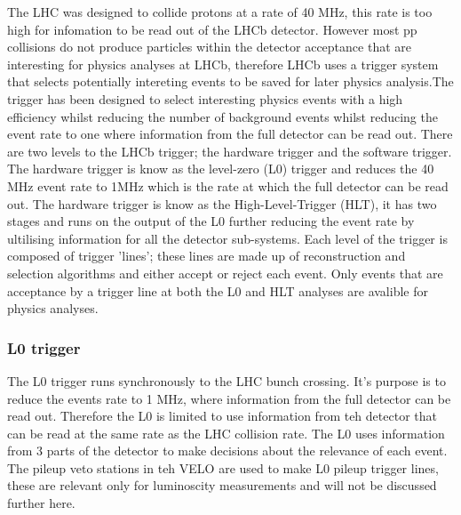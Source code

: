 The LHC was designed to collide protons at a rate of 40 MHz, this rate is too high for infomation to be read out of the LHCb detector. However most pp collisions do not produce particles within the detector acceptance that are interesting for physics analyses at LHCb, therefore LHCb uses a trigger system that selects potentially intereting events to be saved for later physics analysis.The trigger has been designed to select interesting physics events with a high efficiency whilst reducing the number of background events whilst reducing the event rate to one where information from the full detector can be read out.  There are two levels to the LHCb trigger; the hardware trigger and the software trigger. The hardware trigger is know as the level-zero (L0) trigger and reduces the 40 MHz event rate to 1MHz which is the rate at which the full detector can be read out. The hardware trigger is know as the High-Level-Trigger (HLT), it has two stages and runs on the output of the L0 further reducing the event rate by ultilising information for all the detector sub-systems. Each level of the trigger is composed of trigger 'lines'; these lines are made up of reconstruction and selection algorithms and either accept or reject each event. Only events that are acceptance by a trigger line at both the L0 and HLT analyses are avalible for physics analyses. 

\subsubsection{L0 trigger}

The L0 trigger runs synchronously to the LHC bunch crossing. It's purpose is to reduce the events rate to 1 MHz, where information from the full detector can be read out. Therefore the L0 is limited to use information from teh detector that can be read at the same rate as the LHC collision rate.
The L0 uses information from 3 parts of the detector to make decisions about the relevance of each event. The pileup veto stations in teh VELO are used to make L0 pileup trigger lines, these are relevant only for luminoscity measurements and will not be discussed further here.


